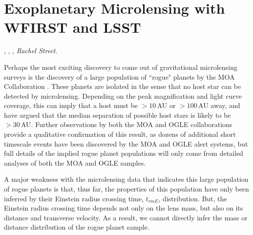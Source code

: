 %
%
%
%

\section{Exoplanetary Microlensing with WFIRST and LSST}
\def\secname{\chpname:microlensing}\label{sec:\secname}

,
,
,
{\it Rachel Street}.

Perhaps the most exciting discovery to come out of gravitational
microlensing surveys is the discovery of a large population of ``rogue"
planets by the MOA Collaboration \citep{2011Natur.473..349S}. These planets
are isolated in the sense that no host star can be detected
by microlensing. Depending on the peak magnification and light curve
coverage, this can imply that a host must be $> 10\,$AU or $> 100\,$AU away,
and \citet{2012ApJ...757..119B} have argued that the median separation
of possible host stars is likely to be $> 30\,$AU.
Further observations by both the MOA and OGLE collaborations provide
a qualitative confirmation of this result, as dozens of additional
short timescale events have been discovered by the MOA and OGLE
alert systems, but full details of the implied rogue planet
populations  will only come from detailed analyses of both the MOA
and OGLE samples.

A major weakness with the microlensing data that indicates this
large population of rogue planets is that, thus far, the properties
of this population have only been inferred by their Einstein radius
crossing time, $t_{rm E}$, distribution. But, the Einstein radius crossing
time depends not only on the lens mass, but also on its distance and
transverse velocity. As a result, we cannot directly infer the mass or distance
distribution of the rogue planet sample.

